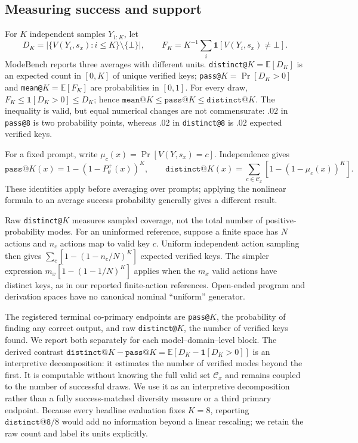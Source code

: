\documentclass{article}
\newcommand{\1}{\mathbf 1}
\newcommand{\E}{\mathbb E}
\theoremstyle{remark}
\theoremstyle{definition}
\theoremstyle{plain}
\begin{document}
\subsection{Measuring success and support}
\label{sec:collapse-metrics}

For $K$ independent samples $Y_{1:K}$, let
\[
  D_K=\bigl|\{V(Y_i,s_x):i\le K\}\setminus\{\bot\}\bigr|,
  \qquad
  F_K=K^{-1}\sum_i \1[V(Y_i,s_x)\neq\bot].
\]
ModeBench reports three averages with different units. \texttt{distinct@}$K
=\E[D_K]$ is an expected count in $[0,K]$ of unique verified keys;
\texttt{pass@}$K=\Pr[D_K>0]$ and \texttt{mean@}$K=\E[F_K]$ are probabilities
in $[0,1]$. For every draw, $F_K\le\1[D_K>0]\le D_K$; hence
$\texttt{mean@}K\le\texttt{pass@}K\le\texttt{distinct@}K$. The inequality is
valid, but equal numerical changes are not commensurate: $.02$ in
\texttt{pass@8} is two probability points, whereas $.02$ in
\texttt{distinct@8} is $.02$ expected verified keys.

For a fixed prompt, write $\mu_c(x)=\Pr[V(Y,s_x)=c]$. Independence gives
\[
 \texttt{pass@}K(x)=1-(1-P_\theta^+(x))^K,\qquad
 \texttt{distinct@}K(x)=\sum_{c\in\mathcal C_x}[1-(1-\mu_c(x))^K].
\]
These identities apply before averaging over prompts; applying the nonlinear
formula to an average success probability generally gives a different result.

Raw \texttt{distinct@}$K$ measures sampled coverage, not the total number of
positive-probability modes. For an uninformed reference, suppose a finite
space has $N$ actions and $n_c$ actions map to valid key $c$. Uniform independent
action sampling then gives $\sum_c[1-(1-n_c/N)^K]$ expected verified keys.
The simpler expression $m_x[1-(1-1/N)^K]$ applies when the $m_x$ valid actions
have distinct keys, as in our reported finite-action references.
Open-ended program and derivation spaces have no canonical nominal
``uniform'' generator.

The registered terminal co-primary endpoints are \texttt{pass@}$K$, the
probability of finding any correct output, and raw \texttt{distinct@}$K$, the
number of verified keys found. We report both separately for each
model--domain--level block. The derived contrast
$\texttt{distinct@}K-\texttt{pass@}K
=\E[D_K-\1[D_K>0]]$ is an interpretive decomposition: it estimates the
number of verified modes beyond the first. It is computable without knowing the
full valid set $\mathcal C_x$ and remains coupled to the number of successful
draws. We use it as an interpretive decomposition rather than a fully
success-matched diversity measure or a third primary endpoint. Because every
headline evaluation fixes $K=8$, reporting $\texttt{distinct@8}/8$ would add no
information beyond a linear rescaling; we retain the raw count and label its
units explicitly.
\end{document}

